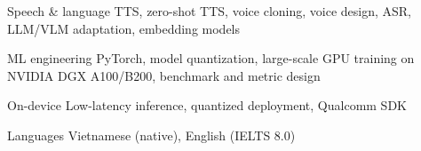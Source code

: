 

\begin{cvskills}

  \cvskill
    {Speech \& language} %
    {TTS, zero-shot TTS, voice cloning, voice design, ASR, LLM/VLM adaptation, embedding models}

  \cvskill
    {ML engineering} %
    {PyTorch, model quantization, large-scale GPU training on NVIDIA DGX A100/B200, benchmark and metric design}

  \cvskill
    {On-device} %
    {Low-latency inference, quantized deployment, Qualcomm SDK}

  \cvskill
    {Languages} %
    {Vietnamese (native), English (IELTS 8.0)}

\end{cvskills}
